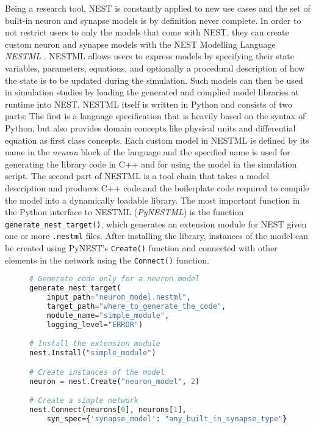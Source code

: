 Being a research tool, NEST is constantly applied to new use cases and the set of built-in neuron and synapse models is by definition never complete. In order to not restrict users to only the models that come with NEST, they can create custom neuron and synapse models with the NEST Modelling Language \emph{NESTML} \citep{plotnikov2016nestml, linssen_charl_a_p_2022_5784175}. NESTML allows users to express models by specifying their state variables, parameters, equations, and optionally a procedural description of how the state is to be updated during the simulation. Such models can then be used in simulation studies by loading the generated and complied model libraries at runtime into NEST. NESTML itself is written in Python and consists of two parts: The first is a language specification that is heavily based on the syntax of Python, but also provides domain concepts like physical units and differential equation as first class concepts. Each custom model in NESTML is defined by its name in the \emph{neuron} block of the language and the specified name is used for generating the library code in C++ and for using the model in the simulation script. The second part of NESTML is a tool chain that takes a model description and produces C++ code and the boilerplate code required to compile the model into a dynamically loadable library. The most important function in the Python interface to NESTML (\emph{PyNESTML}) is the function \texttt{generate\_nest\_target()}, which generates an extension module for NEST given one or more \texttt{.nestml} files. After installing the library, instances of the model can be created using PyNEST's \texttt{Create()} function and connected with other elements in the network using the \texttt{Connect()} function.

\begin{figure}[ht!]
\centering
\begin{lstlisting}[language=Python, label=lst:nestml_without_synapse, caption={Generating extension module code: The \texttt{generate\_nest\_target} function generates code only for a neuron model. The minimum required parameter of the function is the \texttt{input\_path} that points to the location of the model. Once the code is generated, the built libraries can be loaded into NEST using the \texttt{Install} function by providing the name of the module (\emph{simple\_module}). Once the model is installed in NEST, we can create instances of the model by calling the \texttt{Create()} function with the model name being the name that was written in the NESTML file in the \emph{neuron} block.}, captionpos=b]
# Generate code only for a neuron model
generate_nest_target(
    input_path="neuron_model.nestml",
    target_path="where_to_generate_the_code",
    module_name="simple_module",
    logging_level="ERROR")

# Install the extension module
nest.Install("simple_module")

# Create instances of the model
neuron = nest.Create("neuron_model", 2)

# Create a simple network
nest.Connect(neurons[0], neurons[1],
    syn_spec={'synapse_model': "any_built_in_synapse_type"})
\end{lstlisting}
\end{figure}


